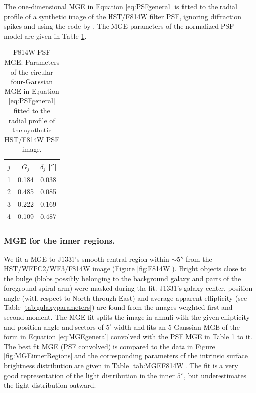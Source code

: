 \documentclass[useAMS,usenatbib]{mnras}
\begin{document}
The one-dimensional MGE in Equation \eqref{eq:PSFgeneral} is fitted to the radial profile of a synthetic image of the HST/F814W filter PSF, ignoring diffraction spikes and using the code by \citet{Cap02}. The MGE parameters of the normalized PSF model are given in Table \ref{tab:PSFMGEF814W}.

\begin{table}
\centering
\caption{F814W PSF MGE: Parameters of the circular four-Gaussian MGE in Equation \eqref{eq:PSFgeneral} fitted to the radial profile of the synthetic HST/F814W PSF image.}
\begin{tabular}{ccc}
\hline
$j$ & $G_j$ & $\delta_j$ [$''$] \\\hline
1 & 0.184 & 0.038\\
2 & 0.485 & 0.085\\
3 & 0.222 & 0.169\\
4 & 0.109 & 0.487\\\hline
\end{tabular}
\label{tab:PSFMGEF814W}
\end{table}

\subsubsection{MGE for the inner regions.}

We fit a MGE to J1331's smooth central region within $\sim 5''$ from the HST/WFPC2/WF3/F814W image (Figure \ref{fig:F814W}). Bright objects close to the bulge (blobs possibly belonging to the background galaxy and parts of the foreground spiral arm) were masked during the fit. J1331's galaxy center, position angle (with respect to North through East) and average apparent ellipticity (see Table \ref{tab:galaxyparameters}) are found from the images weighted first and second moment. The MGE fit splits the image in annuli with the given ellipticity and position angle and sectors of $5^\circ$ width and fits an 5-Gaussian MGE of the form in Equation \eqref{eq:MGEgeneral} convolved with the PSF MGE in Table \ref{tab:PSFMGEF814W} to it. The best fit MGE (PSF convolved) is compared to the data in Figure \ref{fig:MGEinnerRegions} and the corresponding parameters of the intrinsic surface brightness distribution are given in Table \ref{tab:MGEF814W}. The fit is a very good representation of the light distribution in the inner $5''$, but underestimates the light distribution outward.
\end{document}
